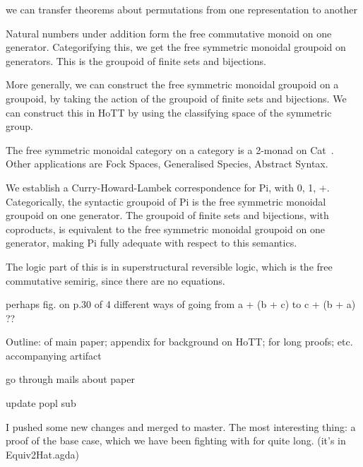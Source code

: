 we can transfer theorems about permutations from one representation to another


Natural numbers under addition form the free commutative monoid on one generator. Categorifying this, we get the free
symmetric monoidal groupoid on generators. This is the groupoid of finite sets and bijections.

More generally, we can construct the free symmetric monoidal groupoid on a groupoid, by taking the action of the
groupoid of finite sets and bijections. We can construct this in HoTT by using the classifying space of the symmetric
group.

The free symmetric monoidal category on a category is a 2-monad on
Cat~\cite{blackwellTwodimensionalMonadTheory1989,abramskyAbstractScalarsLoops2005,leinsterHigherOperadsHigher2004}.
Other applications are Fock Spaces, Generalised Species, Abstract Syntax.

We establish a Curry-Howard-Lambek correspondence for Pi, with 0, 1, +. Categorically, the syntactic groupoid of Pi is
the free symmetric monoidal groupoid on one generator. The groupoid of finite sets and bijections, with coproducts, is
equivalent to the free symmetric monoidal groupoid on one generator, making Pi fully adequate with respect to this
semantics.

The logic part of this is in superstructural reversible logic, which is the free commutative semirig, since there are no
equations.

perhaps fig. on p.30 of 4 different ways of going from a + (b + c) to c + (b + a) ??

Outline: of main paper; appendix for background on HoTT; for long proofs; etc. accompanying artifact

go through mails about paper

update popl sub

I pushed some new changes and merged to master.
The most interesting thing: a proof of the base case, which we have been fighting with for quite long. (it's in Equiv2Hat.agda)

